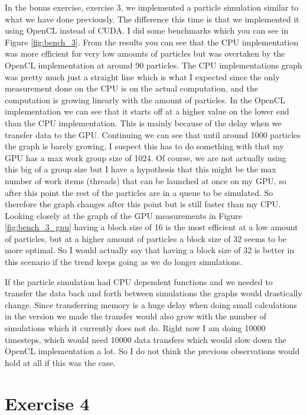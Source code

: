 \documentclass[a4paper, 12pt]{article}
\def\f#1{Figure \ref{fig:#1}}
\begin{document}
%
%
In the bonus exercise, exercise 3, we implemented a particle simulation similar to what we have done previously. The difference this time is that we implemented it using OpenCL instead of CUDA. I did some benchmarks which you can see in \f{bench_3}. From the results you can see that the CPU implementation was more efficient for very low amounts of particles but was overtaken by the OpenCL implementation at around 90 particles. The CPU implementations graph was pretty much just a straight line which is what I expected since the only measurement done on the CPU is on the actual computation, and the computation is growing linearly with the amount of particles. In the OpenCL implementation we can see that it starts off at a higher value on the lower end than the CPU implementation. This is mainly because of the delay when we transfer data to the GPU. Continuing we can see that until around 1000 particles the graph is barely growing, I suspect this has to do something with that my GPU has a max work group size of 1024. Of course, we are not actually using this big of a group size but I have a hypothesis that this might be the max number of work items (threads) that can be launched at once on my GPU, so after this point the rest of the particles are in a queue to be simulated. So therefore the graph changes after this point but is still faster than my CPU. Looking closely at the graph of the GPU measurements in \f{bench_3_gpu} having a block size of 16 is the most efficient at a low amount of particles, but at a higher amount of particles a block size of 32 seems to be more optimal. So I would actually say that having a block size of 32 is better in this scenario if the trend keeps going as we do longer simulations.

If the particle simulation had CPU dependent functions and we needed to transfer the data back and forth between simulations the graphs would drastically change. Since transferring memory is a huge delay when doing small calculations in the version we made the transfer would also grow with the number of simulations which it currently does not do. Right now I am doing 10000 timesteps, which would need 10000 data transfers which would slow down the OpenCL implementation a lot. So I do not think the previous observations would hold at all if this was the case. 

\section{Exercise 4}

\end{document}
